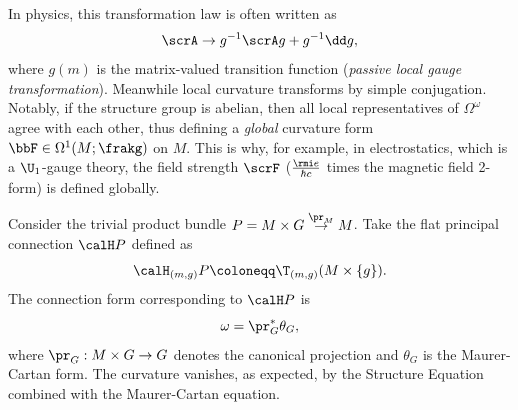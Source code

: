 \begin{rem}
    In physics, this transformation law is often written as 
    \[\scrA\to g^{-1}\scrA g+g^{-1}\dd g,\]
    where $g(m)$ is the matrix-valued transition function (\emph{passive local gauge transformation}). Meanwhile local curvature transforms by simple conjugation. Notably, if the structure group is abelian, then all local representatives of $\Omega^\omega$ agree with each other, thus defining a \emph{global} curvature form $\bbF\in\Omega^1(M;\frakg)$ on $M$. This is why, for example, in electrostatics, which is a $\U_1$-gauge theory, the field strength $\scrF$ ($\frac{\rmi e}{\hbar c}$ times the magnetic field 2-form) is defined globally.
\end{rem}
 



\begin{example}\label{ex 1.3.18 RS2}
    Consider the trivial product bundle $P=M\times G\overset{\pr_M}{\to}M$. Take the flat principal connection $\calH P$ defined as 
    \[\calH_{(m,g)}P\coloneqq \T_{(m,g)}(M\times \{g\}).\]
    The connection form corresponding to $\calH P$ is
    \[\omega=\pr_G^\ast \theta_G,\]
    where $\pr_G:M\times G\to G$ denotes the canonical projection and $\theta_G$ is the Maurer-Cartan form. The curvature vanishes, as expected, by the Structure Equation combined with the Maurer-Cartan equation.
\end{example}

